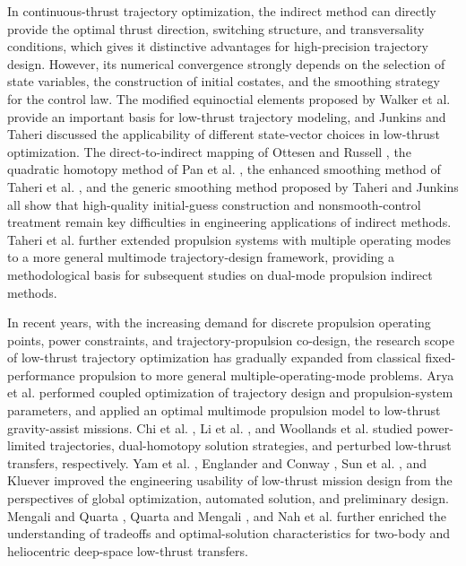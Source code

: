 \documentclass{IEEEtaes}
\begin{document}
In continuous-thrust trajectory optimization, the indirect method can directly provide the optimal thrust direction, switching structure, and transversality conditions, which gives it distinctive advantages for high-precision trajectory design. However, its numerical convergence strongly depends on the selection of state variables, the construction of initial costates, and the smoothing strategy for the control law. The modified equinoctial elements proposed by Walker et al. \cite{walker1985} provide an important basis for low-thrust trajectory modeling, and Junkins and Taheri \cite{junkins2019} discussed the applicability of different state-vector choices in low-thrust optimization. The direct-to-indirect mapping of Ottesen and Russell \cite{ottesen2024}, the quadratic homotopy method of Pan et al. \cite{pan2019}, the enhanced smoothing method of Taheri et al. \cite{taheri2016}, and the generic smoothing method proposed by Taheri and Junkins \cite{taheri2018} all show that high-quality initial-guess construction and nonsmooth-control treatment remain key difficulties in engineering applications of indirect methods. Taheri et al. \cite{taheri2020b} further extended propulsion systems with multiple operating modes to a more general multimode trajectory-design framework, providing a methodological basis for subsequent studies on dual-mode propulsion indirect methods.

In recent years, with the increasing demand for discrete propulsion operating points, power constraints, and trajectory-propulsion co-design, the research scope of low-thrust trajectory optimization has gradually expanded from classical fixed-performance propulsion to more general multiple-operating-mode problems. Arya et al. \cite{arya2021a,arya2021b} performed coupled optimization of trajectory design and propulsion-system parameters, and applied an optimal multimode propulsion model to low-thrust gravity-assist missions. Chi et al. \cite{chi2018}, Li et al. \cite{li2019}, and Woollands et al. \cite{woollands2020} studied power-limited trajectories, dual-homotopy solution strategies, and perturbed low-thrust transfers, respectively. Yam et al. \cite{yam2013}, Englander and Conway \cite{englander2017}, Sun et al. \cite{sun2016}, and Kluever \cite{kluever2014} improved the engineering usability of low-thrust mission design from the perspectives of global optimization, automated solution, and preliminary design. Mengali and Quarta \cite{mengali2008}, Quarta and Mengali \cite{quarta2011}, and Nah et al. \cite{nah2001} further enriched the understanding of tradeoffs and optimal-solution characteristics for two-body and heliocentric deep-space low-thrust transfers.
\end{document}
